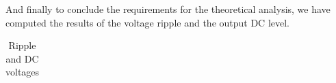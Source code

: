And finally to conclude the requirements for the theoretical analysis, we have computed the results of the voltage ripple and the output DC level.

\FloatBarrier
\begin{table}[h]
  \centering
  \begin{tabular}{|c|c|}
    \hline    
    
    \hline
  \end{tabular}
  \caption{Ripple and DC voltages}
  \label{tab:Octave}
\end{table}
\FloatBarrier 








